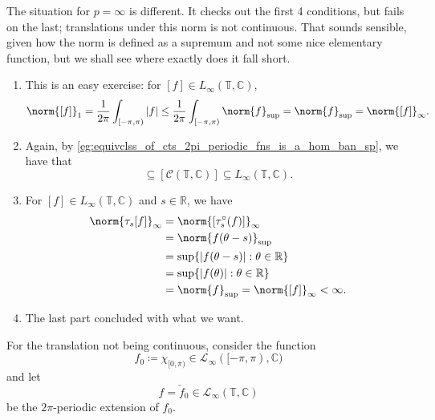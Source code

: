 \documentclass[notoc,notitlepage]{tufte-book}
\DeclareMathOperator{\Trig}{Trig}
\begin{document}
\begin{eg}
  The situation for $p = \infty$ is different.
  It checks out the first 4 conditions, but fails on the last;
  translations under this norm is not continuous.
  That sounds sensible, given how the norm is defined as a supremum
  and not some nice elementary function, but we shall see
  where exactly does it fall short.
  \begin{enumerate}
    \item This is an easy exercise: for $[f] \in L_\infty(\mathbb{T}, \mathbb{C})$,
      \begin{equation*}
        \norm{[f]}_1 = \frac{1}{2\pi} \int_{[-\pi, \pi)} \abs{f}
        \leq \frac{1}{2\pi} \int_{[-\pi, \pi)} \norm{f}_{\sup}
        = \norm{f}_{\sup} = \norm{[f]}_{\infty}.
      \end{equation*}
    \item Again, by \cref{eg:equivclss_of_cts_2pi_periodic_fns_is_a_hom_ban_sp},
      we have that
      \begin{equation*}
        [\Trig(\mathbb{T}, \mathbb{C})]
        \subseteq [\mathcal{C}(\mathbb{T}, \mathbb{C})]
        \subseteq L_\infty(\mathbb{T}, \mathbb{C}).
      \end{equation*}
    \item For $[f] \in L_\infty(\mathbb{T}, \mathbb{C})$ and $s \in \mathbb{R}$,
      we have
      \begin{align*}
        \norm{\tau_s[f]}_{\infty}
        &= \norm{[\tau_s^{\circ}(f)]}_\infty \\
        &= \norm{f(\theta - s)}_{\sup} \\
        &= \sup \{ \abs{f(\theta - s)} : \theta \in \mathbb{R} \} \\
        &= \sup \{ \abs{f(\theta)} : \theta \in \mathbb{R} \} \\
        &= \norm{f}_{\sup} = \norm{[f]}_\infty < \infty.
      \end{align*}
    \item The last part concluded with what we want.
  \end{enumerate}

  For the translation not being continuous, consider the function
  \begin{equation*}
    f_0 \coloneqq \chi_{[0, \pi)} \in \mathcal{L}_\infty([-\pi, \pi), \mathbb{C})
  \end{equation*}
  and let
  \begin{equation*}
    f = \check{f}_0 \in \mathcal{L}_\infty(\mathbb{T}, \mathbb{C})
  \end{equation*}
  be the $2\pi$-periodic extension of $f_0$.


\end{eg}
\end{document}
